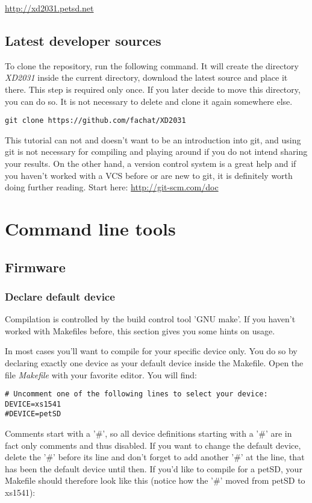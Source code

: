 \url{http://xd2031.petsd.net}


\subsection{Latest developer sources}

To clone the repository, run the following command. It will create the directory 
\textit{XD2031} inside the current directory, download the latest source and place it there.
This step is required only once. If you later decide to move this directory, you can do so.
It is not necessary to delete and clone it again somewhere else.

\begin{verbatim}
git clone https://github.com/fachat/XD2031
\end{verbatim}

This tutorial can not and doesn't want to be an introduction into git,
and using git is not necessary for compiling and playing around if you
do not intend sharing your results. On the other hand, a version control system is
a great help and if you haven't worked with a VCS before or are new to git, it is definitely 
worth doing further reading. 
Start here: \url{http://git-scm.com/doc}

\section{Command line tools}
\subsection{Firmware}
\subsubsection{Declare default device}
Compilation is controlled by the build control tool 'GNU make'. If you haven't worked with Makefiles before,
this section gives you some hints on usage.

In most cases you'll want to compile for your specific device only. 
You do so by declaring exactly one device as your default device inside
the Makefile. Open the file \textit{Makefile} with your favorite editor.
You will find:

\clearpage
\begin{verbatim}
# Uncomment one of the following lines to select your device:
DEVICE=xs1541
#DEVICE=petSD
\end{verbatim}

Comments start with a '\#', so all device definitions starting with a '\#'
are in fact only comments and thus disabled. If you want to change the
default device, delete the '\#' before its line and don't forget to add
another '\#' at the line, that has been the default device until then.
If you'd like to compile for a petSD, your Makefile should therefore look
like this (notice how the '\#' moved from petSD to xs1541):

